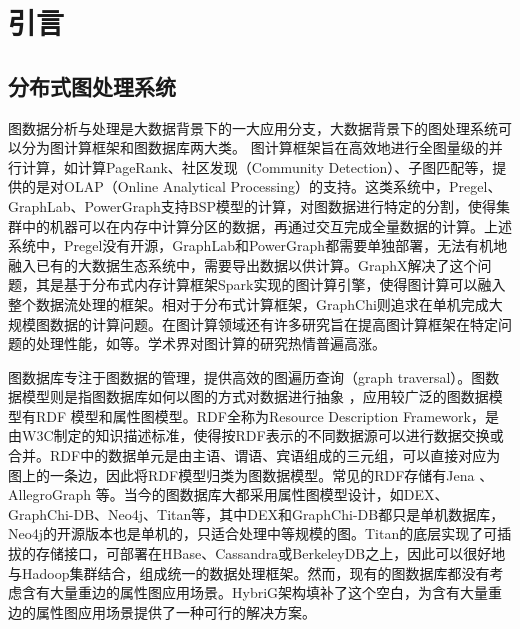 
\chapter{引言}

\section{分布式图处理系统}
图数据分析与处理是大数据背景下的一大应用分支\supercite{big_data}，大数据背景下的图处理系统可以分为图计算框架和图数据库两大类。
图计算框架旨在高效地进行全图量级的并行计算，如计算PageRank\supercite{pagerank}、社区发现\supercite{community_detection}（Community Detection）、子图匹配\supercite{subgraph_listing}等，提供的是对OLAP（Online Analytical Processing）的支持。这类系统中，Pregel\supercite{pregel}、GraphLab\supercite{graphlab}、PowerGraph\supercite{powergraph}支持BSP\supercite{BSP}模型的计算，对图数据进行特定的分割，使得集群中的机器可以在内存中计算分区的数据，再通过交互完成全量数据的计算。上述系统中，Pregel没有开源，GraphLab和PowerGraph都需要单独部署，无法有机地融入已有的大数据生态系统中，需要导出数据以供计算。GraphX\supercite{graphx}解决了这个问题，其是基于分布式内存计算框架Spark\supercite{spark}实现的图计算引擎，使得图计算可以融入整个数据流处理的框架。相对于分布式计算框架，GraphChi\supercite{graphchi}则追求在单机完成大规模图数据的计算问题。在图计算领域还有许多研究旨在提高图计算框架在特定问题的处理性能，如\supercites{xuning_LogGP,xuning_2,shaoxia_1,shaoxia_2,shaoxia_3}等。学术界对图计算的研究热情普遍高涨。

图数据库专注于图数据的管理，提供高效的图遍历查询（graph traversal）。图数据模型则是指图数据库如何以图的方式对数据进行抽象 \supercite{graph_models_survey}，应用较广泛的图数据模型有RDF 模型和属性图模型。RDF全称为Resource Description Framework，是由W3C制定的知识描述标准，使得按RDF表示的不同数据源可以进行数据交换或合并。RDF中的数据单元是由主语、谓语、宾语组成的三元组，可以直接对应为图上的一条边，因此将RDF模型归类为图数据模型。常见的RDF存储有Jena 、AllegroGraph 等。当今的图数据库大都采用属性图模型设计\supercite{graph_database_models}，如DEX\supercite{DEX}、GraphChi-DB\supercite{graphchi-db}、Neo4j、Titan等，其中DEX和GraphChi-DB都只是单机数据库，Neo4j的开源版本也是单机的，只适合处理中等规模的图。Titan的底层实现了可插拔的存储接口，可部署在HBase、Cassandra或BerkeleyDB之上，因此可以很好地与Hadoop集群结合，组成统一的数据处理框架。然而，现有的图数据库都没有考虑含有大量重边的属性图应用场景。HybriG架构填补了这个空白，为含有大量重边的属性图应用场景提供了一种可行的解决方案。


